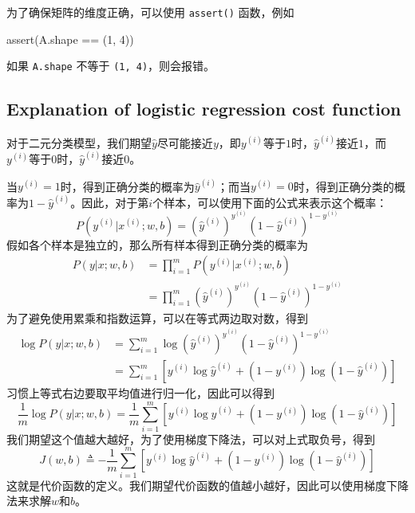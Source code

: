 \vspace{0.5\baselineskip}
为了确保矩阵的维度正确，可以使用 \verb|assert()| 函数，例如
\begin{python}
assert(A.shape == (1, 4))
\end{python}
如果 \verb|A.shape| 不等于 \verb|(1, 4)|，则会报错。

\subsection{Explanation of logistic regression cost function}

对于二元分类模型，我们期望$\hat{y}$尽可能接近$y$，即${y}^{(i)}$等于$1$时，$\hat{y}^{(i)}$接近$1$，而${y}^{(i)}$等于$0$时，$\hat{y}^{(i)}$接近$0$。

当$y^{(i)}=1$时，得到正确分类的概率为$\hat{y}^{(i)}$；而当$y^{(i)}=0$时，得到正确分类的概率为$1-\hat{y}^{(i)}$。因此，对于第$i$个样本，可以使用下面的公式来表示这个概率：
\begin{equation}
    P(y^{(i)} | x^{(i)}; w, b) = (\hat{y}^{(i)})^{y^{(i)}} (1-\hat{y}^{(i)})^{1-y^{(i)}}
\end{equation}
假如各个样本是独立的，那么所有样本得到正确分类的概率为
\begin{equation}
    \begin{aligned}
        P(y | x; w, b) &= \prod_{i=1}^{m} P(y^{(i)} | x^{(i)}; w, b)\\
        &= \prod_{i=1}^{m} (\hat{y}^{(i)})^{y^{(i)}} (1-\hat{y}^{(i)})^{1-y^{(i)}}
    \end{aligned}
\end{equation}
为了避免使用累乘和指数运算，可以在等式两边取对数，得到
\begin{equation}
    \begin{aligned}
        \log P(y | x; w, b) &= \sum_{i=1}^{m} \log (\hat{y}^{(i)})^{y^{(i)}} (1-\hat{y}^{(i)})^{1-y^{(i)}}\\
        &= \sum_{i=1}^{m} \left[ y^{(i)} \log \hat{y}^{(i)} + (1-y^{(i)}) \log (1-\hat{y}^{(i)}) \right]
    \end{aligned}
\end{equation}
习惯上等式右边要取平均值进行归一化，因此可以得到
\begin{equation}
    \frac{1}{m} \log P(y | x; w, b) = \frac{1}{m} \sum_{i=1}^{m} \left[ y^{(i)} \log \hat{y}^{(i)} + (1-y^{(i)}) \log (1-\hat{y}^{(i)}) \right]
\end{equation}
我们期望这个值越大越好，为了使用梯度下降法，可以对上式取负号，得到
\begin{equation}
    J(w, b) \triangleq - \frac{1}{m} \sum_{i=1}^{m} \left[ y^{(i)} \log \hat{y}^{(i)} + (1-y^{(i)}) \log (1-\hat{y}^{(i)}) \right]
\end{equation}
这就是代价函数的定义。我们期望代价函数的值越小越好，因此可以使用梯度下降法来求解$w$和$b$。

